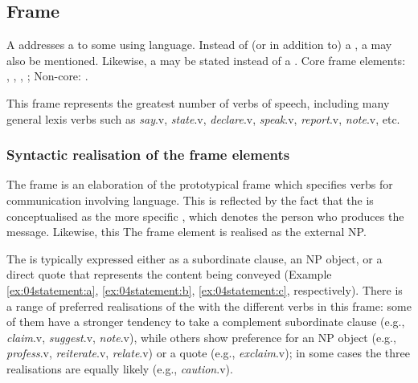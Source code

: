 \documentclass[output=paper,colorlinks,citecolor=brown]{langscibook}
\begin{document}
\subsection{Frame }
\largerpage[2]
\begin{description}[font=\normalfont]
\item[Definition of the frame \framename{Statement}:] A  addresses a  to some  using language. Instead of (or in addition to) a , a  may also be mentioned. Likewise, a  may be stated instead of a . Core frame elements: , , , ; Non-core: .
\end{description}

This frame represents the greatest number of verbs of speech, including many general lexis verbs such as \textit{say}.v, \textit{state}.v, \textit{declare}.v, \textit{speak}.v, \textit{report}.v, \textit{note}.v, etc. 

\subsubsection{Syntactic realisation of the  frame elements}

The frame  is an elaboration of the prototypical frame  which specifies verbs for communication involving language. This is reflected by the fact that the  is conceptualised as the more specific , which denotes the person who produces the message. Likewise, this The frame element  is realised as the external NP.

The  is  typically expressed either as a subordinate clause, an NP object, or a direct quote that represents the content being conveyed (Example \ref{ex:04statement:a}, \ref{ex:04statement:b}, \ref{ex:04statement:c}, respectively). There is a range of preferred realisations of the  with the different verbs in this frame: some of them have a stronger tendency to take a complement subordinate clause (e.g., \textit{claim}.v, \textit{suggest}.v, \textit{note}.v), while others show preference for an NP object (e.g., \textit{profess}.v, \textit{reiterate}.v, \textit{relate}.v) or a quote (e.g., \textit{exclaim}.v); in some cases the three realisations are equally likely (e.g., \textit{caution}.v). 
\end{document}
